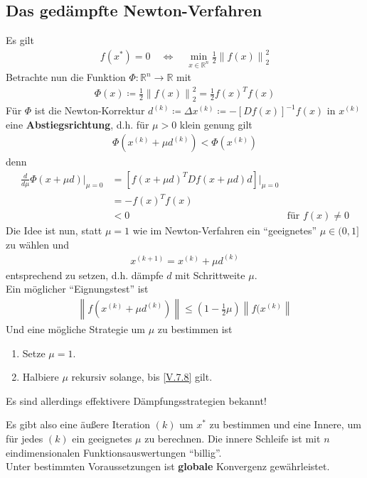 \documentclass[ngerman,fontsize=11pt, paper=a4, parskip=half, titlepage=true, toc=bib]{scrbook}
\newcommand{\R}{\mathds{R}}
\newcommand{\Ren}{\mathds{R}^{n}}
\newcommand{\nn}[1]{\left\| #1 \right\|}
\begin{document}
  \subsection{Das gedämpfte Newton-Verfahren}
  Es gilt
  \begin{gather}
    f(x^{*}) = 0 \quad \Longleftrightarrow \quad 
    \min_{x\in\Ren} \frac{1}{2} \nn{f(x)}_2^2
    \label{V.7.5}
  \end{gather}
  Betrachte nun die Funktion $\Phi: \Ren\longrightarrow \R$ mit 
  \begin{gather*}
    \Phi (x) \coloneqq \frac{1}{2} \nn{f(x)}_2^2 
    = \frac{1}{2} f(x)^T f(x)
  \end{gather*}
  Für $\Phi$ ist die Newton-Korrektur
  $d^{(k)} \coloneqq \Delta x^{(k)} \coloneqq -[Df(x)]^{-1}f(x)$
  in $x^{(k)} $ eine \textbf{Abstiegsrichtung},
  d.h. für $\mu >0 $ klein genung gilt
  \begin{gather}
    \Phi(x^{(k)}+\mu d^{(k)}) < \Phi(x^{(k)} )
    \label{V.7.6}
  \end{gather}
  denn 
  \begin{align*}
    \frac{d}{d\mu} \Phi(x+\mu d)\vert_{\mu = 0} 
    &= [f(x+\mu d)^TDf(x+\mu d)d]\vert_{\mu = 0}\\
    &= -f(x)^Tf(x) \\
    &< 0 & \text{für } f(x)\neq 0
  \end{align*}
  Die Idee ist nun, statt $\mu = 1$ wie im Newton-Verfahren
  ein \enquote{geeignetes} $\mu \in (0,1]$ zu wählen und 
  \begin{gather}
    x^{(k+1)} = x^{(k)} +\mu d^{(k)}
    \label{V.7.7}
  \end{gather}
  entsprechend zu setzen, d.h. dämpfe $d$ mit Schrittweite $\mu$.\\
  Ein möglicher \enquote{Eignungstest} ist
  \begin{gather}
    \nn{f(x^{(k)}+\mu d^{(k)})}
    \leq (1-\frac{1}{2}\mu )\nn{f(x^{(k)}}
    \label{V.7.8}
  \end{gather}
  Und eine mögliche Strategie um $\mu $ zu bestimmen ist 
  \begin{enumerate}[1.]
  \item Setze $\mu=1$.
  \item Halbiere $\mu$ rekursiv solange, bis \eqref{V.7.8} gilt.
  \end{enumerate}
  Es sind allerdings effektivere Dämpfungsstrategien bekannt!

  Es gibt also eine äußere Iteration $(k)$
  um $x^{*}$ zu bestimmen
  und eine Innere, um für jedes $(k)$
  ein geeignetes $\mu$ zu berechnen.
  Die innere Schleife ist mit $n$ eindimensionalen Funktionsauswertungen
  \enquote{billig}. \\
  Unter bestimmten Voraussetzungen ist
  \textbf{globale} Konvergenz gewährleistet.
\end{document}
